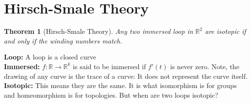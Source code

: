 \documentclass[oneside]{book}\twocolumn
\newtheorem{theorem}{Theorem}
\begin{document}
\section{Hirsch-Smale Theory}
\begin{theorem}[Hirsch-Smale Theory]
Any two immersed loop in $\mathbb R^2$ are isotopic if and only if the winding numbers match.
\end{theorem}
\textbf{Loop:} A loop is a closed curve\\
\textbf{Immersed:} $f:\mathbb R\to\mathbb R^k$ is said to be immersed if $f'(t)$ is never zero. Note, the drawing of any curve is the trace of a curve: It does not represent the curve itself.\\
\textbf{Isotopic:} This means they are the same. It is what isomorphism is for groups and homeomorphism is for topologies. But when are two loops isotopic?
\end{document}
